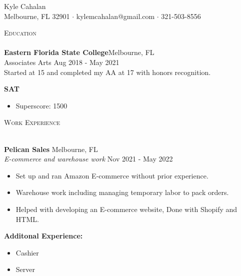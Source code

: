 \documentclass[a4paper]{article}
\newcommand{\lineunder} {
    \vspace*{-8pt} \\
    \hspace*{-18pt} \hrulefill \\
}
\newcommand{\header} [1] {
    {\hspace*{-18pt}\vspace*{6pt} \textsc{#1}}
    \vspace*{-6pt} \lineunder
}
\begin{document}
	\vspace*{-40pt}

		

	\vspace*{-10pt}
	\begin{flushleft}
		{\Huge{Kyle Cahalan}}\\
		Melbourne, FL 32901 $\cdot$ kylemcahalan@gmail.com $\cdot$ 321-503-8556\\
	\end{flushleft}


	\header{Education}
	\textbf{Eastern Florida State College}\hfill Melbourne, FL\\
	Associates Arts  \hfill Aug 2018 - May 2021\\
	Started at 15 and completed my AA at 17 with honors recognition.\\
	\vspace{2mm}

	\textbf{SAT}
	\vspace{-2mm}
	\begin{itemize} \itemsep 1pt
		\item Superscore: 1500
	\end{itemize}



	\header{Work Experience}
	\vspace{1mm}

	\textbf{Pelican Sales} \hfill Melbourne, FL\\
	\textit{E-commerce and warehouse work} \hfill Nov 2021 - May 2022\\
	\vspace{-1mm}
	\begin{itemize} \itemsep 1pt
		\item Set up and ran Amazon E-commerce without prior experience.
		\item Warehouse work including managing temporary labor to pack orders.
		\item Helped with developing an E-commerce website, Done with Shopify and HTML.
	\end{itemize}
	\textbf{Additonal Experience:} \\
	\vspace{-1mm}
	\begin{itemize} \itemsep 1pt
		\item Cashier
		\item Server
	\end{itemize}
\end{document}
